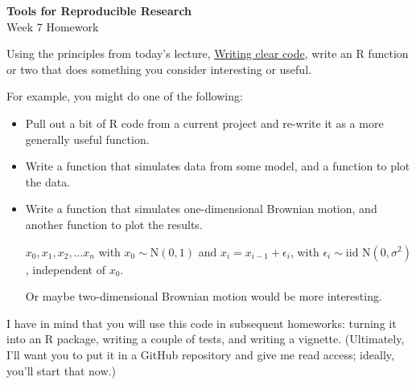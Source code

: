 \documentclass[12pt]{article}
\begin{document}
\thispagestyle{empty}

\textbf{Tools for Reproducible Research} \\
Week 7 Homework

\bigskip

Using the principles from today's lecture,
\href{http://kbroman.org/Tools4RR/assets/today'sectures/07_clearcode.pdf}{Writing
  clear code}, write an R function or two that does something you
consider interesting or useful.

For example, you might do one of the following:

\begin{itemize}

\item Pull out a bit of R code from a current project and re-write it
  as a more generally useful function.

\item Write a function that simulates data from some model, and a
  function to plot the data.

\item Write a function that simulates one-dimensional Brownian motion,
  and another function to plot the results.

  $x_0, x_1, x_2, \dots x_n$ with $x_0 \sim \text{N}(0,1)$ and
  $x_i = x_{i-1} + \epsilon_i$, with $\epsilon_i \sim \text{iid }
  \text{N}(0, \sigma^2)$, independent of $x_0$.

  Or maybe two-dimensional Brownian motion would be more interesting.

\end{itemize}

I have in mind that you will use this code in subsequent homeworks:
turning it into an R package, writing a couple of tests, and writing a
vignette. (Ultimately, I'll want you to put it in a GitHub repository
and give me read access; ideally, you'll start that now.)
\end{document}
